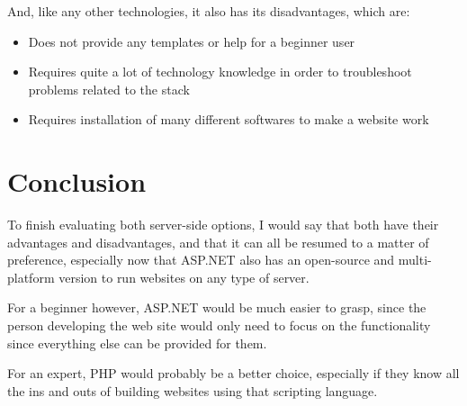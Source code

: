 And, like any other technologies, it also has its disadvantages, which are:
\begin{itemize}
  \item Does not provide any templates or help for a beginner user
  \item Requires quite a lot of technology knowledge in order to troubleshoot
  problems related to the stack
  \item Requires installation of many different softwares to make a website work
\end{itemize}

\section{Conclusion}
To finish evaluating both server-side options, I would say that both have their advantages and disadvantages, and that it can all be resumed to a matter of preference, especially now that ASP.NET also has an open-source and multi-platform version to run websites on any type of server.

For a beginner however, ASP.NET would be much easier to grasp, since the person developing the web site would only need to focus on the functionality since everything else can be provided for them.

For an expert, PHP would probably be a better choice, especially if they know all the ins and outs of building websites using that scripting language.
